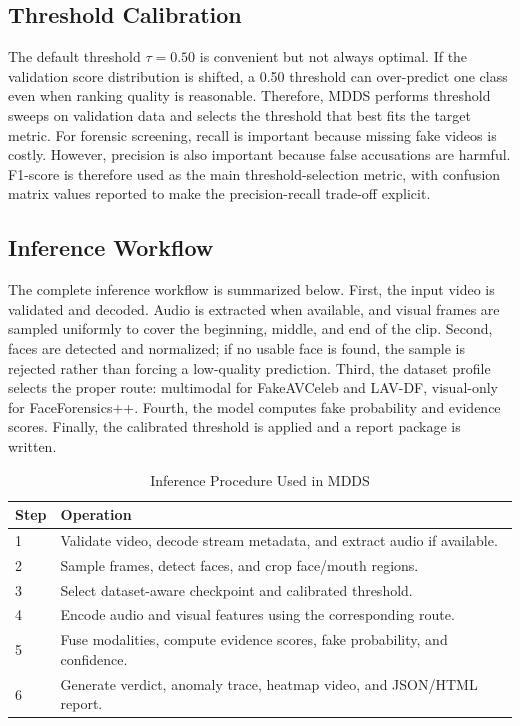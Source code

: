 \documentclass[conference]{IEEEtran}
\begin{document}
\subsection{Threshold Calibration}
The default threshold $\tau=0.50$ is convenient but not always optimal. If the validation score distribution is shifted, a 0.50 threshold can over-predict one class even when ranking quality is reasonable. Therefore, MDDS performs threshold sweeps on validation data and selects the threshold that best fits the target metric. For forensic screening, recall is important because missing fake videos is costly. However, precision is also important because false accusations are harmful. F1-score is therefore used as the main threshold-selection metric, with confusion matrix values reported to make the precision-recall trade-off explicit.

\subsection{Inference Workflow}
The complete inference workflow is summarized below. First, the input video is validated and decoded. Audio is extracted when available, and visual frames are sampled uniformly to cover the beginning, middle, and end of the clip. Second, faces are detected and normalized; if no usable face is found, the sample is rejected rather than forcing a low-quality prediction. Third, the dataset profile selects the proper route: multimodal for FakeAVCeleb and LAV-DF, visual-only for FaceForensics++. Fourth, the model computes fake probability and evidence scores. Finally, the calibrated threshold is applied and a report package is written.

\begin{table}[htbp]
\caption{Inference Procedure Used in MDDS}
\centering
\begin{tabular}{p{0.75cm}p{6.45cm}}
\toprule
Step & Operation \\
\midrule
1 & Validate video, decode stream metadata, and extract audio if available. \\
2 & Sample frames, detect faces, and crop face/mouth regions. \\
3 & Select dataset-aware checkpoint and calibrated threshold. \\
4 & Encode audio and visual features using the corresponding route. \\
5 & Fuse modalities, compute evidence scores, fake probability, and confidence. \\
6 & Generate verdict, anomaly trace, heatmap video, and JSON/HTML report. \\
\bottomrule
\end{tabular}
\end{table}
\end{document}
